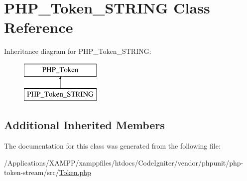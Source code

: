 \hypertarget{class_p_h_p___token___s_t_r_i_n_g}{}\section{P\+H\+P\+\_\+\+Token\+\_\+\+S\+T\+R\+I\+NG Class Reference}
\label{class_p_h_p___token___s_t_r_i_n_g}
Inheritance diagram for P\+H\+P\+\_\+\+Token\+\_\+\+S\+T\+R\+I\+NG\+:\begin{figure}[H]
\begin{center}
\leavevmode
\includegraphics[height=2.000000cm]{class_p_h_p___token___s_t_r_i_n_g}
\end{center}
\end{figure}
\subsection*{Additional Inherited Members}


The documentation for this class was generated from the following file\+:\begin{DoxyCompactItemize}
\item 
/\+Applications/\+X\+A\+M\+P\+P/xamppfiles/htdocs/\+Code\+Igniter/vendor/phpunit/php-\/token-\/stream/src/\mbox{\hyperlink{_token_8php}{Token.\+php}}\end{DoxyCompactItemize}
